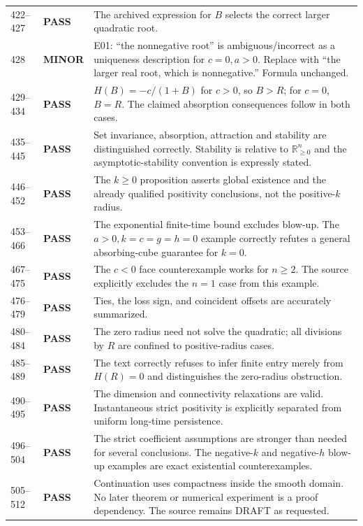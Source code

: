 \documentclass[11pt]{article}
\newcommand{\RR}{\mathbb R}
\newcommand{\Orth}{\RR_{\geq0}^{n}}
\newcommand{\pass}{\textbf{PASS}}
\newcommand{\minor}{\textbf{MINOR}}
\begin{document}
\begin{longtable}{@{}P{0.12\textwidth}P{0.12\textwidth}P{0.71\textwidth}@{}}
422--427 & \pass & The archived expression for $B$ selects the correct
larger quadratic root. \\
428 & \minor & E01: ``the nonnegative root'' is ambiguous/incorrect as
a uniqueness description for $c=0,a>0$. Replace with ``the larger real
root, which is nonnegative.'' Formula unchanged. \\
429--434 & \pass & $H(B)=-c/(1+B)$ for $c>0$, so $B>R$; for $c=0$,
$B=R$. The claimed absorption consequences follow in both cases. \\
435--445 & \pass & Set invariance, absorption, attraction and stability
are distinguished correctly. Stability is relative to $\Orth$ and the
asymptotic-stability convention is expressly stated. \\
446--452 & \pass & The $k\geq0$ proposition asserts global existence and
the already qualified positivity conclusions, not the positive-$k$ radius. \\
453--466 & \pass & The exponential finite-time bound excludes blow-up.
The $a>0,k=c=g=h=0$ example correctly refutes a general absorbing-cube
guarantee for $k=0$. \\
467--475 & \pass & The $c<0$ face counterexample works for $n\geq2$.
The source explicitly excludes the $n=1$ case from this example. \\
476--479 & \pass & Ties, the loss sign, and coincident offsets are
accurately summarized. \\
480--484 & \pass & The zero radius need not solve the quadratic;
all divisions by $R$ are confined to positive-radius cases. \\
485--489 & \pass & The text correctly refuses to infer finite entry
merely from $H(R)=0$ and distinguishes the zero-radius obstruction. \\
490--495 & \pass & The dimension and connectivity relaxations are valid.
Instantaneous strict positivity is explicitly separated from uniform
long-time persistence. \\
496--504 & \pass & The strict coefficient assumptions are stronger than
needed for several conclusions. The negative-$k$ and negative-$h$
blow-up examples are exact existential counterexamples. \\
505--512 & \pass & Continuation uses compactness inside the smooth
domain. No later theorem or numerical experiment is a proof dependency.
The source remains DRAFT as requested. \\
\bottomrule
\end{longtable}
\normalsize
\end{document}
